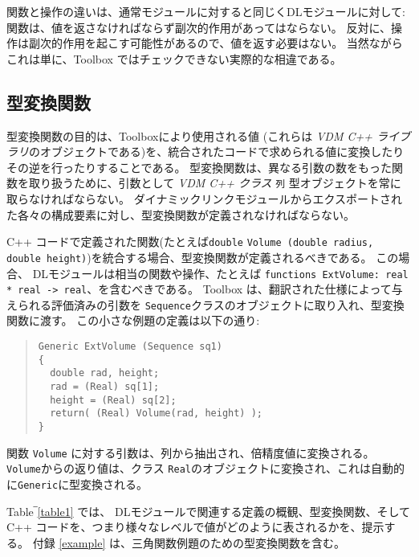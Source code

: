 \documentclass[\pformat,12pt]{jarticle}
\begin{document}
関数と操作の違いは、通常モジュールに対すると同じくDLモジュールに対して:関数は、値を返さなければならず副次的作用があってはならない。
反対に、操作は副次的作用を起こす可能性があるので、値を返す必要はない。
当然ながらこれは単に、Toolbox ではチェックできない実際的な相違である。


\subsection{型変換関数}

型変換関数の目的は、Toolboxにより使用される値 (これらは {\it VDM C++ ライブラリ}のオブジェクトである)を、統合されたコードで求められる値に変換したりその逆を行ったりすることである。
型変換関数は、異なる引数の数をもった関数を取り扱うために、引数として {\it
  VDM C++ クラス}  {\tt 列} 型オブジェクトを常に取らなければならない。
ダイナミックリンクモジュールからエクスポートされた各々の構成要素に対し、型変換関数が定義されなければならない。

 C++ コードで定義された関数(たとえば{\tt double} {\tt Volume (double radius, double height)})を統合する場合、型変換関数が定義されるべきである。
この場合、 DLモジュールは相当の関数や操作、たとえば {\tt functions ExtVolume: real * real -> real}、を含むべきである。
Toolbox は、翻訳された仕様によって与えられる評価済みの引数を {\tt Sequence}クラスのオブジェクトに取り入れ、型変換関数に渡す。
この小さな例題の定義は以下の通り:

\begin{quote}
\begin{verbatim}
Generic ExtVolume (Sequence sq1)
{
  double rad, height;
  rad = (Real) sq[1];
  height = (Real) sq[2];
  return( (Real) Volume(rad, height) );
}
\end{verbatim}
\end{quote}

関数 {\tt Volume} に対する引数は、列から抽出され、倍精度値に変換される。
{\tt Volume}からの返り値は、クラス {\tt Real}のオブジェクトに変換され、これは自動的に{\tt Generic}に型変換される。

Table‾\ref{table1} では、 DLモジュールで関連する定義の概観、型変換関数、そして C++ コードを、つまり様々なレベルで値がどのように表されるかを、提示する。 
付録 \ref{example} は、三角関数例題のための型変換関数を含む。
\end{document}
